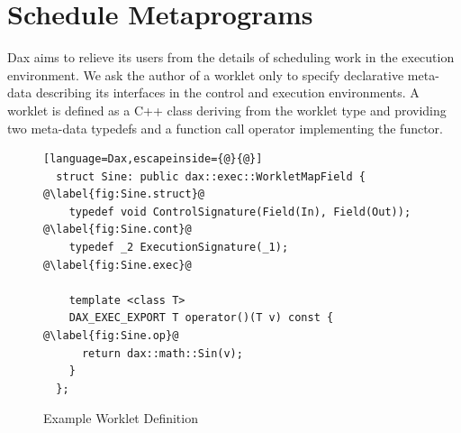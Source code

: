 \documentclass[conference]{IEEEtran}
\newcommand{\Ck}[1]{{#1}} %
\newcommand{\Ci}[1]{\color{blue}{#1}} %
\newcommand{\Cu}[1]{{\textbf{#1}}} %
\begin{document}
\section{Schedule Metaprograms}
\label{sec:ScheduleMetaprograms}

\noindent
%
Dax aims to relieve its users from the details of scheduling work in
the execution environment.
%
We ask the author of a worklet only to specify declarative meta-data
describing its interfaces in the control and execution environments.
%
A worklet is defined as a C++ class deriving from the worklet type and
providing two meta-data typedefs and a function call operator
implementing the functor.

\begin{figure}[ht]
  \centering
  \begin{lstlisting}[language=Dax,escapeinside={@}{@}]
  struct Sine: public dax::exec::WorkletMapField { @\label{fig:Sine.struct}@
    typedef void ControlSignature(Field(In), Field(Out)); @\label{fig:Sine.cont}@
    typedef _2 ExecutionSignature(_1); @\label{fig:Sine.exec}@

    template <class T>
    DAX_EXEC_EXPORT T operator()(T v) const { @\label{fig:Sine.op}@
      return dax::math::Sin(v);
    }
  };
 \end{lstlisting}
 \caption{Example Worklet Definition}
\label{fig:Sine}
\end{figure}

\end{document}
